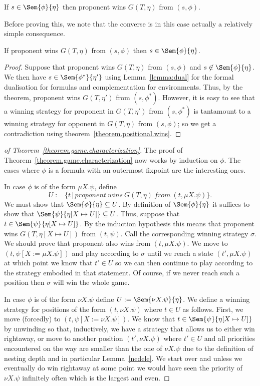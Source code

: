 \begin{theorem}\label{theorem.game.characterization}
If $s \in \Sem{\phi}{\eta}$ then proponent wins $G(T,\eta)$ from $(s,\phi)$\@.
\end{theorem}
Before proving this, we note that the converse is in this case actually a relatively simple consequence. 
\begin{corollary}\label{corollary.game.characterization}
If proponent wins $G(T,\eta)$ from $(s,\phi)$ then $s \in \Sem{\phi}{\eta}$\@. 
\end{corollary}
\begin{proof}
Suppose that proponent wins $G(T,\eta)$ from $(s,\phi)$ and $s \not\in \Sem{\phi}{\eta}$\@.
We then have $s \in \Sem{\phi^*}{\eta'}$ using Lemma~\ref{lemma:dual} for the
formal dualisation for formulas and complementation for environments\@.
Thus, by the theorem, proponent wins $G(T,\eta')$ from $(s,\phi^*)$\@. 
However, it is easy to see that a winning strategy for proponent in $G(T,\eta')$ from
$(s,\phi^*)$ is tantamount to a winning strategy for opponent in $G(T,\eta)$
from $(s,\phi)$\@; so we get a contradiction using theorem~\ref{theorem.positional.wins}\@. 
\end{proof}
\begin{proof}[of Theorem~\ref{theorem.game.characterization}]
The proof of Theorem~\ref{theorem.game.characterization} now works by
 induction
on $\phi$\@. The cases where $\phi$ is a formula with an outermost fixpoint are the interesting ones. 

In case $\phi$ is of the form $\mu X.\psi$\@, 
define 
  $$U := \{t \,|\, \mathit{proponent~wins~} G(T,\eta) \mathit{~from~}  (t,\mu X.\psi)\}.$$  
We must show that $\Sem{\phi}{\eta} \subseteq U$\@. 
By definition of $\Sem{\phi}{\eta}$ it suffices to show that $\Sem{\psi}{\eta[X \mapsto U]} \subseteq U$\@.
Thus, suppose that $t \in \Sem{\psi}{\eta[X \mapsto U]}$\@.
By the induction hypothesis this means that proponent wins $G(T,\eta[X \mapsto U])$ from $(t,\psi)$\@.
Call the corresponding winning strategy $\sigma$\@.  
We should prove that proponent also wins from $(t,\mu X.\psi)$\@. 
We move to $(t,\psi[X:= \mu X.\psi])$ and play
according to $\sigma$ until we reach a state $(t',\mu X.\psi)$ at which point we
know that $t'\in U$ so we can then continue to play according to the
strategy embodied in that statement. 
Of course, if we never reach such a position then $\sigma$ 
will win the whole game.

In case $\phi$ is of the form $\nu X.\psi$ define $ U := \Sem{\nu
  X.\psi}{\eta}$\@.  We define a winning strategy for positions of the
form $(t,\nu X.\psi)$ where $t\in U$ as follows.  First, we move
(forcedly) to $(t,\psi[X:=\nu X.\psi])$\@.  We know that $t \in
\Sem{\psi}{\eta[X \mapsto U]}$ by unwinding so that, inductively, we
have a strategy that allows us to either win rightaway, or move to
another position $(t',\nu X.\psi)$ where $t' \in U$ and all priorities
encountered on the way are smaller than the one of $\nu X.\psi$ due to
the definition of nesting depth and in particular
Lemma~\ref{nedele}. We start over and unless we eventually do win
rightaway at some point we would have seen the priority of $\nu
X.\psi$ infinitely often which is the largest and even.
\end{proof}
